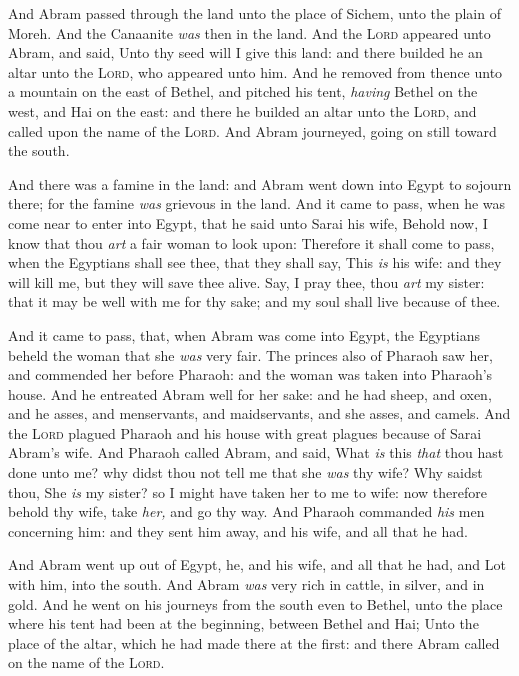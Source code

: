 \documentclass[11pt,letterpaper,oneside]{memoir}
\begin{document}
And Abram passed through the land unto the place of Sichem, unto the
plain of Moreh. And the Canaanite \emph{was} then in the land. And the
\textsc{Lord} appeared unto Abram, and said, Unto thy seed will I give
this land: and there builded he an altar unto the \textsc{Lord}, who
appeared unto him. And he removed from thence unto a mountain on the
east of Bethel, and pitched his tent, \emph{having} Bethel on the west,
and Hai on the east: and there he builded an altar unto the \textsc{Lord},
and called upon the name of the \textsc{Lord}. And Abram journeyed, going
on still toward the south.

And there was a famine in the land: and Abram went down into Egypt to
sojourn there; for the famine \emph{was} grievous in the land. And it
came to pass, when he was come near to enter into Egypt, that he said
unto Sarai his wife, Behold now, I know that thou \emph{art} a fair
woman to look upon: Therefore it shall come to pass, when the Egyptians
shall see thee, that they shall say, This \emph{is} his wife: and they
will kill me, but they will save thee alive. Say, I pray thee, thou
\emph{art} my sister: that it may be well with me for thy sake; and my
soul shall live because of thee.

And it came to pass, that, when Abram was come into Egypt, the Egyptians
beheld the woman that she \emph{was} very fair. The princes also of
Pharaoh saw her, and commended her before Pharaoh: and the woman was
taken into Pharaoh's house. And he entreated Abram well for her sake:
and he had sheep, and oxen, and he asses, and menservants, and
maidservants, and she asses, and camels. And the \textsc{Lord} plagued
Pharaoh and his house with great plagues because of Sarai Abram's wife.
And Pharaoh called Abram, and said, What \emph{is} this \emph{that} thou
hast done unto me? why didst thou not tell me that she \emph{was} thy
wife? Why saidst thou, She \emph{is} my sister? so I might have taken
her to me to wife: now therefore behold thy wife, take \emph{her,} and
go thy way. And Pharaoh commanded \emph{his} men concerning him: and
they sent him away, and his wife, and all that he had.

And Abram went up out of Egypt, he, and his wife, and all that he had,
and Lot with him, into the south. And Abram \emph{was} very rich in
cattle, in silver, and in gold. And he went on his journeys from the
south even to Bethel, unto the place where his tent had been at the
beginning, between Bethel and Hai; Unto the place of the altar, which he
had made there at the first: and there Abram called on the name of the
\textsc{Lord}.
\end{document}
